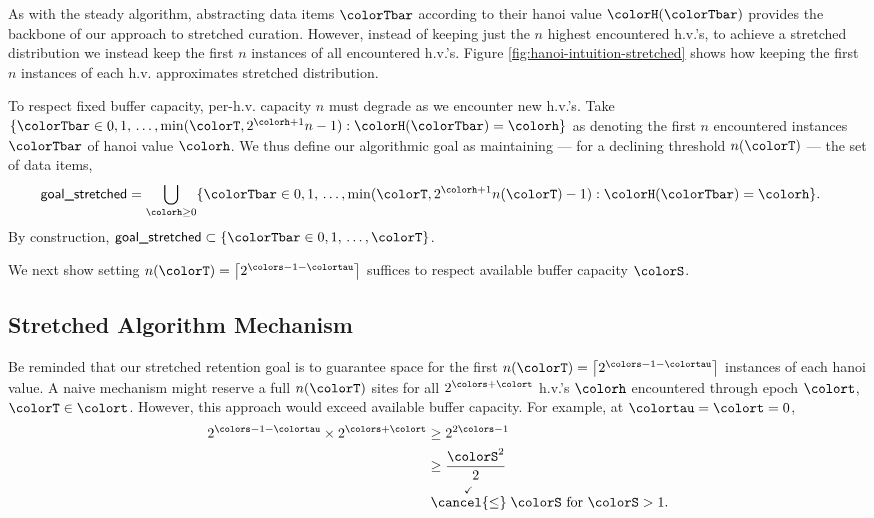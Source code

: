 As with the steady algorithm, abstracting data items $\colorTbar$ according to their hanoi value $\colorH(\colorTbar)$ provides the backbone of our approach to stretched curation.
However, instead of keeping just the $n$ highest encountered h.v.'s, to achieve a stretched distribution we instead keep the first $n$ instances of all encountered h.v.'s.
Figure \ref{fig:hanoi-intuition-stretched} shows how keeping the first $n$ instances of each h.v. approximates stretched distribution.

To respect fixed buffer capacity, per-h.v. capacity $n$ must degrade as we encounter new h.v.'s.
Take $\{ \colorTbar \in 0, 1, \, \ldots, \min(\colorT, 2^{\colorh + 1}n - 1) : \colorH(\colorTbar) = \colorh \}$ as denoting the first $n$ encountered instances $\colorTbar$ of hanoi value $\colorh$.
We thus define our algorithmic goal as maintaining --- for a declining threshold $n(\colorT)$ --- the set of data items,
\begin{align*}
\textsf{goal\_stretched}
&=
\bigcup_{\colorh \geq 0}
\{ \colorTbar \in 0, 1, \, \ldots, \min(\colorT, 2^{\colorh + 1}n(\colorT) - 1) : \colorH(\colorTbar) = \colorh \}.
\end{align*}
By construction, $\textsf{goal\_stretched} \subset \{ \colorTbar \in 0, 1, \, \ldots, \colorT \}$.

We next show setting $n(\colorT) = \left\lceil 2^{\colors - 1 - \colortau} \right\rceil$ suffices to respect available buffer capacity $\colorS$.





\subsection{Stretched Algorithm Mechanism}
\label{sec:stretched-mechanism}



Be reminded that our stretched retention goal is to guarantee space for the first $n(\colorT) =  \left\lceil2^{\colors - 1 - \colortau}\right\rceil$ instances of each hanoi value.
A naive mechanism might reserve a full $n(\colorT)$ sites for all $2^{\colors + \colort}$ h.v.'s $\colorh$ encountered through epoch $\colort$, $\colorT \in \colort$.
However, this approach would exceed available buffer capacity.
For example, at $\colortau=\colort=0$,
\begin{align*}
2^{\colors - 1 - \colortau} \times 2^{\colors + \colort}
&\geq
2^{2\colors - 1}\\
&\geq
\frac{\colorS^{2}}{2}\\
&\stackrel{\checkmark}{\cancel{\leq}} \colorS \text{ for } \colorS > 1.
\end{align*}

